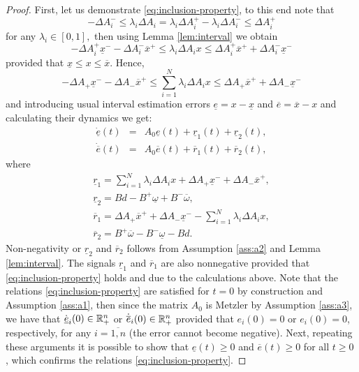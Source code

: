 \begin{proof}
	First, let us demonstrate \eqref{eq:inclusion-property}, to this end note that
	\[
	-\Delta A_{i}^{-}\leq\lambda_{i}\Delta A_{i}=\lambda_{i}\Delta A_{i}^{+}-\lambda_{i}\Delta A_{i}^{-}\leq\Delta A_{i}^{+}
	\]
	for any $\lambda_{i}\in[0,1],$ then using Lemma \ref{lem:interval} we obtain
	\[
	-\Delta A_{i}^{+}\underline{x}^{-}-\Delta A_{i}^{-}\overline{x}^{+}\leq\lambda_{i}\Delta A_{i}x\leq\Delta A_{i}^{+}\overline{x}^{+}+\Delta A_{i}^{-}\underline{x}^{-}
	\]
	provided that $\underline{x}\leq x\leq\overline{x}$. Hence,
	\[
	-\Delta A_{+}\underline{x}^{-}-\Delta A_{-}\overline{x}^{+}\leq\sum_{i=1}^{N}\lambda_{i}\Delta A_{i}x\leq\Delta A_{+}\overline{x}^{+}+\Delta A_{-}\underline{x}^{-}
	\]
	and introducing usual interval estimation errors $\underline{e}=x-\underline{x}$ and $\overline{e}=\overline{x}-x$ and calculating their dynamics we get:
	\begin{eqnarray*}
		\dot{\underline{e}}(t) & = & A_{0}\underline{e}(t)+\underline{r}_{1}(t)+\underline{r}_{2}(t),\\
		\dot{\overline{e}}(t) & = & A_{0}\overline{e}(t)+\overline{r}_{1}(t)+\overline{r}_{2}(t),
	\end{eqnarray*}
	where
	\begin{gather*}
	\underline{r}_{1}=\sum_{i=1}^{N}\lambda_{i}\Delta A_{i}x+\Delta A_{+}\underline{x}^{-}+\Delta A_{-}\overline{x}^{+},\\
	\underline{r}_{2}=Bd-B^{+}\underline{\omega}+B^{-}\overline{\omega},\\
	\overline{r}_{1}=\Delta A_{+}\overline{x}^{+}+\Delta A_{-}\underline{x}^{-}-\sum_{i=1}^{N}\lambda_{i}\Delta A_{i}x,\\
	\overline{r}_{2}=B^{+}\overline{\omega}-B^{-}\underline{\omega}-Bd.
	\end{gather*}
	Non-negativity or $\underline{r}_{2}$ and $\overline{r}_{2}$ follows from Assumption \ref{ass:a2} and Lemma \ref{lem:interval}. The signals $\underline{r}_{1}$ and $\overline{r}_{1}$ are also nonnegative provided that \eqref{eq:inclusion-property} holds and due to the calculations above. Note that the relations \eqref{eq:inclusion-property} are satisfied for $t=0$ by construction and Assumption \ref{ass:a1}, then since the matrix $A_{0}$ is Metzler by Assumption \ref{ass:a3}, we have that $\dot{\underline{e}}_{i}(0)\in\mathbb{R}_{+}^{n}$ or $\dot{\overline{e}}_{i}(0)\in\mathbb{R}_{+}^{n}$ provided that $e_{i}(0)=0$ or $e_{i}(0)=0$, respectively, for any $i=\overline{1,n}$ (the error cannot become negative). Next, repeating these arguments it is possible to show that $\underline{e}(t)\geq0$ and $\overline{e}(t)\geq0$ for all $t\geq0$ \citep{Smith95}, which confirms the relations \eqref{eq:inclusion-property}.
	

\end{proof}
